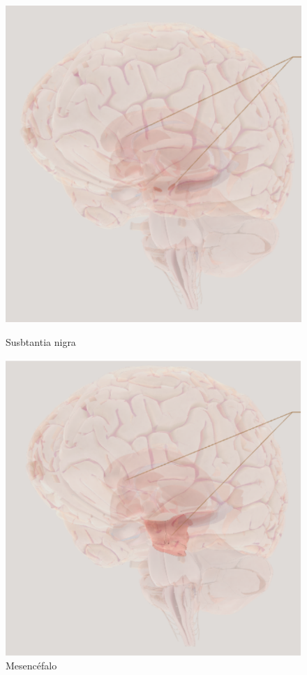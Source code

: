 \begin{figure}[H]
	\begin{minipage}[b]{0.5\linewidth}
		\centering
		\includegraphics[width=\linewidth]{sub-n.png}
		\caption{Susbtantia nigra}
		\label{fig:subs-nig}
	\end{minipage}
	\hspace{0.5cm}
	\begin{minipage}[b]{0.5\linewidth}
		\centering
		\includegraphics[width=\linewidth]{mesenc.png}
		\caption{Mesencéfalo}
		\label{fig:mesenc}
	\end{minipage}
\end{figure}




